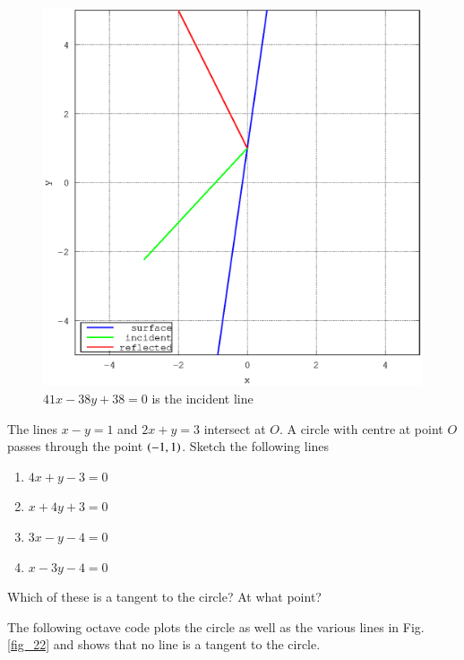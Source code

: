 \documentclass[journal,12pt,twocolumn]{IEEEtran}
\begin{document}
\begin{figure}[h]
\centering
\includegraphics[width=\columnwidth]{./version_2/ee16b1021/ee16b1021}
\caption{ $41x - 38y +38 = 0$ is the incident line}
\label{fig_21}	
\end{figure}
%
\begin{problem}
The lines $x-y=1$ and $2x+y=3$ intersect at $O$.  A circle with centre at point $O$ passes through the point $\left(-1,1\right)$. Sketch the following lines
\begin{enumerate}
\item $4x +y -3 = 0$
\item $x + 4y+3 = 0$
\item $3x - y  - 4 = 0$
\item $x - 3y - 4 = 0$
\end{enumerate}
Which of these is a tangent to the circle? At what point?
\end{problem}
\solution

%
The following octave code plots the circle as well as the various lines  in Fig. \ref{fig_22} and shows that no  line is a tangent to the circle.

%
\end{document}
